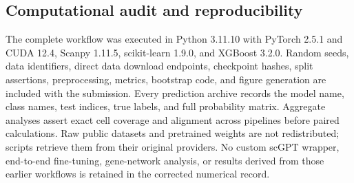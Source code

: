 \subsection{Computational audit and reproducibility}

The complete workflow was executed in Python 3.11.10 with PyTorch 2.5.1 and CUDA 12.4, Scanpy 1.11.5, scikit-learn 1.9.0, and XGBoost 3.2.0. Random seeds, data identifiers, direct data download endpoints, checkpoint hashes, split assertions, preprocessing, metrics, bootstrap code, and figure generation are included with the submission. Every prediction archive records the model name, class names, test indices, true labels, and full probability matrix. Aggregate analyses assert exact cell coverage and alignment across pipelines before paired calculations. Raw public datasets and pretrained weights are not redistributed; scripts retrieve them from their original providers. No custom scGPT wrapper, end-to-end fine-tuning, gene-network analysis, or results derived from those earlier workflows is retained in the corrected numerical record.
